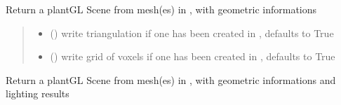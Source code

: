 \documentclass[letterpaper,10pt,english]{sphinxmanual}
\begin{document}
\begin{fulllineitems}
\begin{fulllineitems}
\label{\detokenize{reference:LVM.LightVegeManager.plantGL_nolight}}
\pysigstartsignatures
{}
\pysigstopsignatures
\sphinxAtStartPar
Return a plantGL Scene from mesh(es) in , with geometric informations
\begin{quote}\begin{description}
\begin{itemize}
\item {} 
\sphinxAtStartPar
{} (\sphinxstyleliteralemphasis{\sphinxupquote{, }}) \textendash{} write triangulation if one has been created in {\hyperref[\detokenize{reference:LVM.LightVegeManager.build}]{}}, defaults to True

\item {} 
\sphinxAtStartPar
{} (\sphinxstyleliteralemphasis{\sphinxupquote{, }}) \textendash{} write grid of voxels if one has been created in {\hyperref[\detokenize{reference:LVM.LightVegeManager.build}]{}}, defaults to True

\end{itemize}

\end{description}\end{quote}

\end{fulllineitems}


\begin{fulllineitems}
\label{\detokenize{reference:LVM.LightVegeManager.plantGL_light}}
\pysigstartsignatures
{}
\pysigstopsignatures
\sphinxAtStartPar
Return a plantGL Scene from mesh(es) in , with geometric informations and lighting results


\end{fulllineitems}
\end{fulllineitems}
\end{document}

